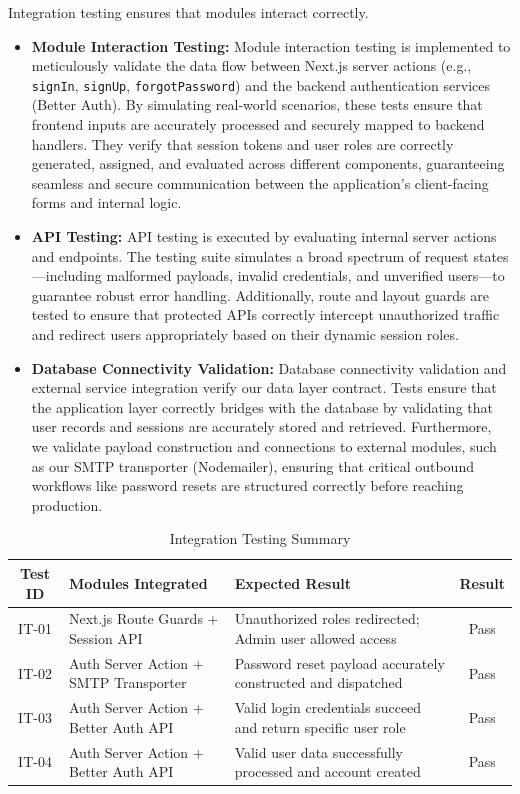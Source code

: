 Integration testing ensures that modules interact correctly.

\begin{itemize}
    \item \textbf{Module Interaction Testing:} Module interaction testing is implemented to meticulously validate the data flow between Next.js server actions (e.g., \texttt{signIn}, \texttt{signUp}, \texttt{forgotPassword}) and the backend authentication services (Better Auth). By simulating real-world scenarios, these tests ensure that frontend inputs are accurately processed and securely mapped to backend handlers. They verify that session tokens and user roles are correctly generated, assigned, and evaluated across different components, guaranteeing seamless and secure communication between the application's client-facing forms and internal logic.
    \item \textbf{API Testing:} API testing is executed by evaluating internal server actions and endpoints. The testing suite simulates a broad spectrum of request states—including malformed payloads, invalid credentials, and unverified users—to guarantee robust error handling. Additionally, route and layout guards are tested to ensure that protected APIs correctly intercept unauthorized traffic and redirect users appropriately based on their dynamic session roles.
    \item \textbf{Database Connectivity Validation:} Database connectivity validation and external service integration verify our data layer contract. Tests ensure that the application layer correctly bridges with the database by validating that user records and sessions are accurately stored and retrieved. Furthermore, we validate payload construction and connections to external modules, such as our SMTP transporter (Nodemailer), ensuring that critical outbound workflows like password resets are structured correctly before reaching production.
\end{itemize}

\begin{table}[h]
\centering
\caption{Integration Testing Summary}
\begin{tabularx}{\textwidth}{|c|X|X|c|}
\hline
\textbf{Test ID} & \textbf{Modules Integrated} & \textbf{Expected Result} & \textbf{Result} \\
\hline
IT-01 & Next.js Route Guards + Session API & Unauthorized roles redirected; Admin user allowed access & Pass \\
\hline
IT-02 & Auth Server Action + SMTP Transporter & Password reset payload accurately constructed and dispatched & Pass \\
\hline
IT-03 & Auth Server Action + Better Auth API & Valid login credentials succeed and return specific user role & Pass \\
\hline
IT-04 & Auth Server Action + Better Auth API & Valid user data successfully processed and account created & Pass \\
\hline
\end{tabularx}
\end{table}


